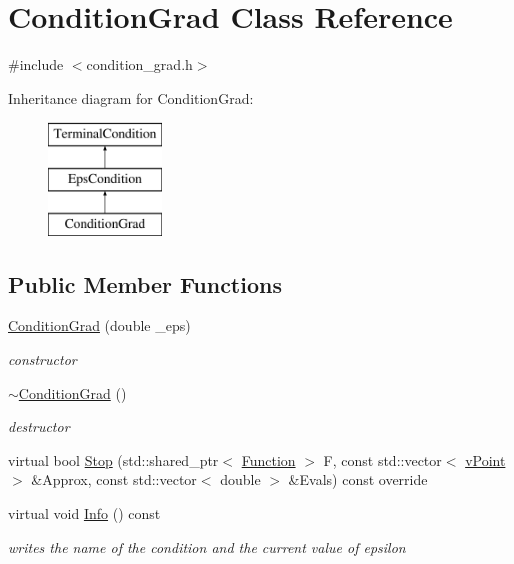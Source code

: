 \hypertarget{class_condition_grad}{}\section{Condition\+Grad Class Reference}
\label{class_condition_grad}


{\ttfamily \#include $<$condition\+\_\+grad.\+h$>$}

Inheritance diagram for Condition\+Grad\+:\begin{figure}[H]
\begin{center}
\leavevmode
\includegraphics[height=3.000000cm]{class_condition_grad}
\end{center}
\end{figure}
\subsection*{Public Member Functions}
\begin{DoxyCompactItemize}
\item 
\mbox{\label{class_condition_grad_a117455621eed050b982af3797e4ae232}} 
\hyperlink{class_condition_grad_a117455621eed050b982af3797e4ae232}{Condition\+Grad} (double \+\_\+eps)
\begin{DoxyCompactList}\small\item\em constructor \end{DoxyCompactList}\item 
\mbox{\label{class_condition_grad_a8320f7ec520c5a8a3f76981faccba3a8}} 
\hyperlink{class_condition_grad_a8320f7ec520c5a8a3f76981faccba3a8}{$\sim$\+Condition\+Grad} ()
\begin{DoxyCompactList}\small\item\em destructor \end{DoxyCompactList}\item 
virtual bool \hyperlink{class_condition_grad_a28d97a0d0291b24976d4499b904190a7}{Stop} (std\+::shared\+\_\+ptr$<$ \hyperlink{class_function}{Function} $>$ F, const std\+::vector$<$ \hyperlink{classv_point}{v\+Point} $>$ \&Approx, const std\+::vector$<$ double $>$ \&Evals) const override
\item 
\mbox{\label{class_condition_grad_a76f405067bfa70754c77dfadbaad5d3e}} 
virtual void \hyperlink{class_condition_grad_a76f405067bfa70754c77dfadbaad5d3e}{Info} () const
\begin{DoxyCompactList}\small\item\em writes the name of the condition and the current value of epsilon \end{DoxyCompactList}\end{DoxyCompactItemize}
